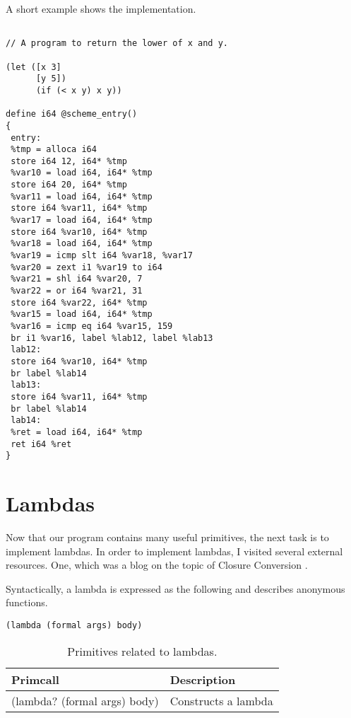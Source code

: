 \documentclass{article}
\begin{document}
A short example shows the implementation.

\begingroup
    \fontsize{8pt}{5pt}\selectfont
\begin{verbatim}

// A program to return the lower of x and y. 

(let ([x 3] 
      [y 5])
      (if (< x y) x y))

define i64 @scheme_entry()
{
 entry: 
 %tmp = alloca i64
 store i64 12, i64* %tmp
 %var10 = load i64, i64* %tmp
 store i64 20, i64* %tmp
 %var11 = load i64, i64* %tmp
 store i64 %var11, i64* %tmp
 %var17 = load i64, i64* %tmp
 store i64 %var10, i64* %tmp
 %var18 = load i64, i64* %tmp
 %var19 = icmp slt i64 %var18, %var17
 %var20 = zext i1 %var19 to i64
 %var21 = shl i64 %var20, 7
 %var22 = or i64 %var21, 31
 store i64 %var22, i64* %tmp
 %var15 = load i64, i64* %tmp
 %var16 = icmp eq i64 %var15, 159
 br i1 %var16, label %lab12, label %lab13 
 lab12:
 store i64 %var10, i64* %tmp
 br label %lab14 
 lab13:
 store i64 %var11, i64* %tmp
 br label %lab14 
 lab14:
 %ret = load i64, i64* %tmp
 ret i64 %ret
}
\end{verbatim}
\endgroup

\section{Lambdas}

Now that our program contains many useful primitives, the next task is to implement lambdas. In order to implement lambdas, I visited several external resources. One, which was a blog on the topic of Closure Conversion \cite{closure-conversion}.

Syntactically, a lambda is expressed as the following and describes anonymous functions. 

\begin{verbatim}
(lambda (formal args) body)
\end{verbatim}

\begin{table}[ht]
  \centering
\begin{tabular}{ l l }
  \toprule
  Primcall & Description \\ \hline
  \midrule
  (lambda? (formal args) body) & Constructs a lambda \\
  \bottomrule
\end{tabular}
\caption{Primitives related to lambdas.} \label{tab:lambdas}
\end{table}
\end{document}
